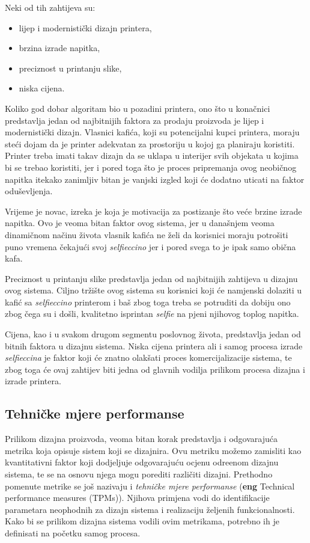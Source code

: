 \documentclass[12pt]{article}
\begin{document}
Neki od tih zahtijeva su:
\begin{itemize}
\item lijep i modernisti\v{c}ki dizajn printera,
\item brzina izrade napitka,
\item preciznost u printanju slike,
\item niska cijena.
\end{itemize}

Koliko god dobar algoritam bio u pozadini printera, ono \v{s}to u kona\v{c}nici predstavlja jedan od najbitnijih faktora za prodaju proizvoda je lijep i modernisti\v{c}ki dizajn. Vlasnici kafi\'ca, koji su potencijalni kupci printera, moraju ste\'ci dojam da je printer adekvatan za prostoriju u kojoj ga planiraju koristiti. Printer treba imati takav dizajn da se uklapa u interijer svih objekata u kojima bi se trebao koristiti, jer i pored toga \v{s}to je proces pripremanja ovog neobi\v{c}nog napitka itekako zanimljiv bitan je vanjski izgled koji \'ce dodatno uticati na faktor odu\v{s}evljenja.

Vrijeme je novac, izreka je koja je motivacija za postizanje \v{s}to ve\'ce brzine izrade napitka. Ovo je veoma bitan faktor ovog sistema, jer u dana\v{s}njem veoma dinami\v{c}nom na\v{c}inu \v{z}ivota vlasnik kafi\'ca ne \v{z}eli da korisnici moraju potro\v{s}iti puno vremena \v{c}ekaju\'ci svoj \textit{selfieccino} jer i pored svega to je ipak samo obi\v{c}na kafa.

Preciznost u printanju slike predstavlja jedan od najbitnijih zahtijeva u dizajnu ovog sistema. Ciljno tr\v{z}i\v{s}te ovog sistema su korisnici koji \'ce namjenski dolaziti u kafi\'c sa \textit{selfieccino} printerom i ba\v{s} zbog toga treba se potruditi da dobiju ono zbog \v{c}ega su i do\v{s}li, kvalitetno isprintan \textit{selfie} na pjeni njihovog toplog napitka.

Cijena, kao i u svakom drugom segmentu poslovnog \v{z}ivota, predstavlja jedan od bitnih faktora u dizajnu sistema. Niska cijena printera  ali i samog procesa izrade \textit{selfieccina} je faktor koji \'ce znatno olak\v{s}ati proces komercijalizacije sistema, te zbog toga \'ce ovaj zahtijev biti jedna od glavnih vodilja prilikom procesa dizajna i izrade printera.
 
\subsection{Tehni\v{c}ke mjere performanse} 

Prilikom dizajna proizvoda, veoma bitan korak predstavlja i odgovaraju\'ca metrika koja opisuje sistem koji se dizajnira. Ovu metriku mo\v{z}emo zamisliti kao kvantitativni faktor koji dodjeljuje odgovaraju\'cu ocjenu odre\dj enom dizajnu sistema, te se na osnovu njega mogu porediti razli\v{c}iti dizajni. Prethodno pomenute metrike se jo\v{s} nazivaju i \textit{tehni\v{c}ke mjere performanse} (\textbf{eng} Technical performance measures (TPMs)). Njihova primjena vodi do identifikacije parametara neophodnih za dizajn sistema i realizaciju \v{z}eljenih funkcionalnosti. Kako bi se prilikom dizajna sistema vodili ovim metrikama, potrebno ih je definisati na po\v{c}etku samog procesa. 
\end{document}
